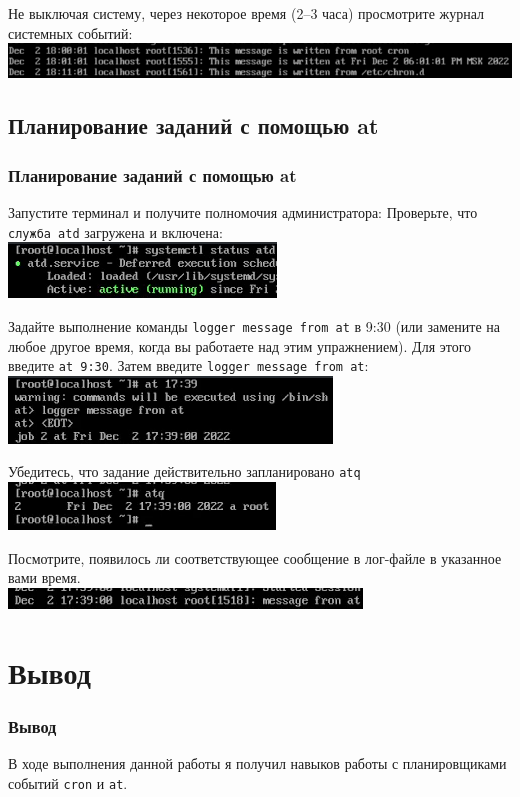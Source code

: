 \documentclass{beamer}
\begin{document}
\begin{frame}[plain]
	Не выключая систему, через некоторое время (2–3 часа) просмотрите журнал системных событий:
	\\\includegraphics{13.png}
\end{frame}



\subsection{Планирование заданий с помощью at}
\begin{frame}[plain]
	\frametitle{Планирование заданий с помощью at}
	Запустите терминал и получите полномочия администратора:
	Проверьте, что \texttt{служба atd} загружена и включена:
	\\\includegraphics{14.png}
\end{frame}
\begin{frame}[plain]
	Задайте выполнение команды \texttt{logger message from at} в 9:30 (или замените на любое другое время, когда вы работаете над этим упражнением). Для этого введите \texttt{at 9:30}. Затем введите \texttt{logger message from at}:
	\\\includegraphics{15.png}
\end{frame}
\begin{frame}[plain]
	Убедитесь, что задание действительно запланировано \texttt{atq}
	\\\includegraphics{16.png}
\end{frame}
\begin{frame}[plain]
	Посмотрите, появилось ли соответствующее сообщение в лог-файле в указанное вами время.
	\\\includegraphics{17.png}
\end{frame}

\section{Вывод}
\begin{frame}[plain]
	\frametitle{Вывод}
	В ходе выполнения данной работы я получил навыков работы с планировщиками событий \texttt{cron} и \texttt{at}.
\end{frame}
\end{document}
